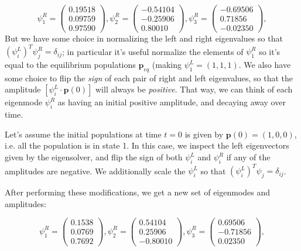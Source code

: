 \documentclass[11pt, oneside]{article}   	%
\begin{document}
\[
\psi_1^R  = \begin{pmatrix} 0.19518  \\ 0.09759 \\ 0.97590 \end{pmatrix}, 
\psi_2^R  = \begin{pmatrix} -0.54104  \\ -0.25906 \\ 0.80010 \end{pmatrix}, 
\psi_3^R  = \begin{pmatrix} -0.69506  \\ 0.71856 \\ -0.02350 \end{pmatrix}, 
\]
But we have some choice in normalizing the left and right eigenvalues so that $(\psi^L_i)^T\psi_j^R = \delta_{ij}$; in particular it's useful normalize the elements of $\psi_1^R$ so it's equal to the equilibrium populations $\mathbf{p}_{eq}$ (making $\psi_1^L = (1,1,1)$. We also have some choice to flip the \textit{sign} of each pair of right and left eigenvalues, so that the amplitude $[\psi^L_i \cdot  \mathbf{p}(0)]$ will always be \textit{positive}.   That way, we can think of each eigenmode $\psi^R_i$ as having an initial positive amplitude, and decaying away over time.  

Let's assume the initial populations at time $t=0$ is given by $\mathbf{p}(0) = (1,0,0)$, i.e. all the population is in state 1. In this case, we inspect the left eigenvectors given by the eigensolver, and flip the sign of both $\psi_i^L$ and $\psi_i^R$ if any of the amplitudes are negative.  We additionally scale the $\psi_i^L$ so that  $(\psi^L_i)^T\psi_j = \delta_{ij}$.

After performing these modifications, we get a new set of eigenmodes and amplitudes:

\[
\psi_1^R  = \begin{pmatrix} 0.1538  \\ 0.0769  \\ 0.7692  \end{pmatrix}, 
\psi_2^R  = \begin{pmatrix} 0.54104  \\ 0.25906 \\ -0.80010 \end{pmatrix}, 
\psi_3^R  = \begin{pmatrix} 0.69506  \\ -0.71856 \\ 0.02350 \end{pmatrix}, 
\]
\end{document}
